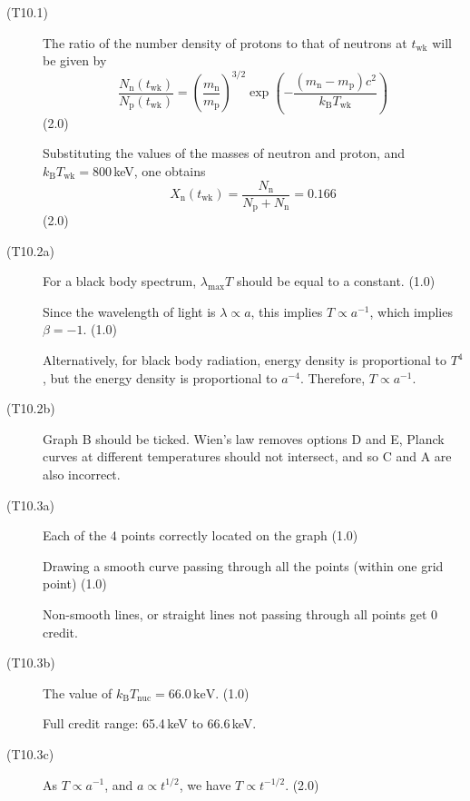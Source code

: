 \begin{description}
\item[(T10.1)] The ratio of the number density of protons to that of
  neutrons at $t_{\mathrm{wk}}$ will be given by
  \[ \frac{N_{\mathrm{n}}(t_{\mathrm{wk}})}{N_{\mathrm{p}}(t_{\mathrm{wk}})}
     = \left(\frac{m_{\mathrm{n}}}{m_{\mathrm{p}}}\right)^{3/2}
       \exp\left(-\frac{(m_{\mathrm{n}} - m_{\mathrm{p}})c^2}
                        {k_{\mathrm{B}}T_{\mathrm{wk}}}\right) \]
  \hfill(2.0)

  Substituting the values of the masses of neutron and proton, and
  $k_{\mathrm{B}}T_{\mathrm{wk}} = 800$\,keV, one obtains
  \[ X_{\mathrm{n}}(t_{\mathrm{wk}})
     = \frac{N_{\mathrm{n}}}{N_{\mathrm{p}} + N_{\mathrm{n}}} = 0.166 \]
  \hfill(2.0)

\item[(T10.2a)] For a black body spectrum,
  $\lambda_{\mathrm{max}}T$ should be equal to a constant. \hfill(1.0)

  Since the wavelength of light is $\lambda \propto a$, this implies
  $T \propto a^{-1}$, which implies $\beta = -1$. \hfill(1.0)

  Alternatively, for black body radiation, energy density is proportional
  to $T^4$, but the energy density is proportional to $a^{-4}$.
  Therefore, $T \propto a^{-1}$.

\item[(T10.2b)] Graph B should be ticked. Wien's law removes options D
  and E, Planck curves at different temperatures should not intersect,
  and so C and A are also incorrect.

\item[(T10.3a)] Each of the 4 points correctly located on the graph
  \hfill(1.0)

  Drawing a smooth curve passing through all the points (within one grid
  point) \hfill(1.0)

  Non-smooth lines, or straight lines not passing through all points get
  0 credit.

\item[(T10.3b)] The value of
  $k_{\mathrm{B}}T_{\mathrm{nuc}} = 66.0\,\mathrm{keV}$. \hfill(1.0)

  Full credit range: 65.4\,keV to 66.6\,keV.

\item[(T10.3c)] As $T \propto a^{-1}$, and $a \propto t^{1/2}$, we have
  $T \propto t^{-1/2}$. \hfill(2.0)


\end{description}
